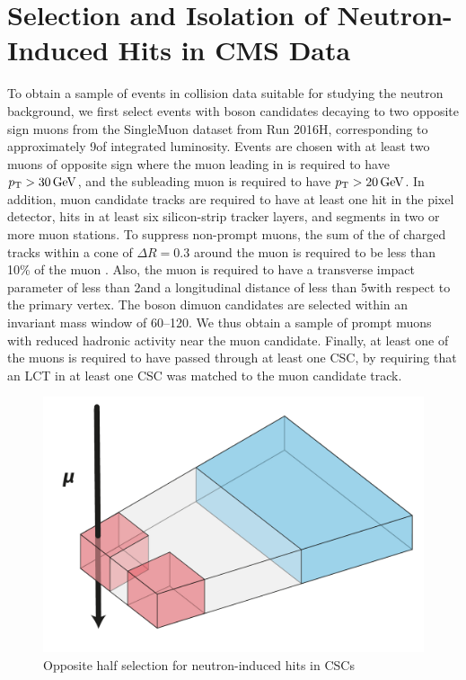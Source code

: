\section{Selection and Isolation of Neutron-Induced Hits in CMS Data}
\label{sec:selection}
To obtain a sample of events in \pp collision data suitable for studying the neutron background, we first select events with \PZ boson candidates decaying to two opposite sign muons from the SingleMuon dataset from Run 2016H, corresponding to approximately 9\fbinv of integrated luminosity. Events are chosen with at least two muons of opposite sign where the muon leading in \pt is required to have $p_{\mathrm{T}} > 30\,\text{Ge\hspace{-.08em}V}$, and the subleading muon is required to have $p_{\mathrm{T}} > 20\,\text{Ge\hspace{-.08em}V}$. In addition, muon candidate tracks are required to have at least one hit in the pixel detector, hits in at least six silicon-strip tracker layers, and segments in two or more muon stations. To suppress non-prompt muons, the sum of the \pt of charged tracks within a cone of $\Delta R=0.3$ around the muon is required to be less than 10\% of the muon \pt. Also, the muon is required to have a transverse impact parameter of less than 2\mm and a longitudinal distance of less than 5\mm with respect to the primary vertex. The \PZ boson dimuon candidates are selected within an invariant mass window of 60--120\GeV. We thus obtain a sample of prompt muons with reduced hadronic activity near the muon candidate. Finally, at least one of the muons is required to have passed through at least one CSC, by requiring that an LCT in at least one CSC was matched to the muon candidate track. 

\begin{figure}[htbp]
	\centering
	\includegraphics[width=\dummyFigWidth]{figures/neutron/CornerSelection.pdf}
	\caption{Opposite half selection for neutron-induced hits in CSCs}
	\label{fig:corner}
\end{figure}

